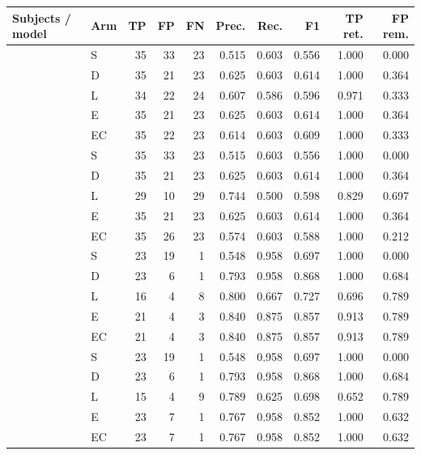 \begin{tabular}{llrrrrrrrr}
\toprule
Subjects / model & Arm & TP & FP & FN & Prec. & Rec. & F1 & TP ret. & FP rem. \\
\midrule
{} & S & 35 & 33 & 23 & 0.515 & 0.603 & 0.556 & 1.000 & 0.000 \\
 & D & 35 & 21 & 23 & 0.625 & 0.603 & 0.614 & 1.000 & 0.364 \\
 & L & 34 & 22 & 24 & 0.607 & 0.586 & 0.596 & 0.971 & 0.333 \\
 & E & 35 & 21 & 23 & 0.625 & 0.603 & 0.614 & 1.000 & 0.364 \\
 & EC & 35 & 22 & 23 & 0.614 & 0.603 & 0.609 & 1.000 & 0.333 \\
\midrule
{} & S & 35 & 33 & 23 & 0.515 & 0.603 & 0.556 & 1.000 & 0.000 \\
 & D & 35 & 21 & 23 & 0.625 & 0.603 & 0.614 & 1.000 & 0.364 \\
 & L & 29 & 10 & 29 & 0.744 & 0.500 & 0.598 & 0.829 & 0.697 \\
 & E & 35 & 21 & 23 & 0.625 & 0.603 & 0.614 & 1.000 & 0.364 \\
 & EC & 35 & 26 & 23 & 0.574 & 0.603 & 0.588 & 1.000 & 0.212 \\
\midrule
{} & S & 23 & 19 & 1 & 0.548 & 0.958 & 0.697 & 1.000 & 0.000 \\
 & D & 23 & 6 & 1 & 0.793 & 0.958 & 0.868 & 1.000 & 0.684 \\
 & L & 16 & 4 & 8 & 0.800 & 0.667 & 0.727 & 0.696 & 0.789 \\
 & E & 21 & 4 & 3 & 0.840 & 0.875 & 0.857 & 0.913 & 0.789 \\
 & EC & 21 & 4 & 3 & 0.840 & 0.875 & 0.857 & 0.913 & 0.789 \\
\midrule
{} & S & 23 & 19 & 1 & 0.548 & 0.958 & 0.697 & 1.000 & 0.000 \\
 & D & 23 & 6 & 1 & 0.793 & 0.958 & 0.868 & 1.000 & 0.684 \\
 & L & 15 & 4 & 9 & 0.789 & 0.625 & 0.698 & 0.652 & 0.789 \\
 & E & 23 & 7 & 1 & 0.767 & 0.958 & 0.852 & 1.000 & 0.632 \\
 & EC & 23 & 7 & 1 & 0.767 & 0.958 & 0.852 & 1.000 & 0.632 \\
\bottomrule
\end{tabular}
